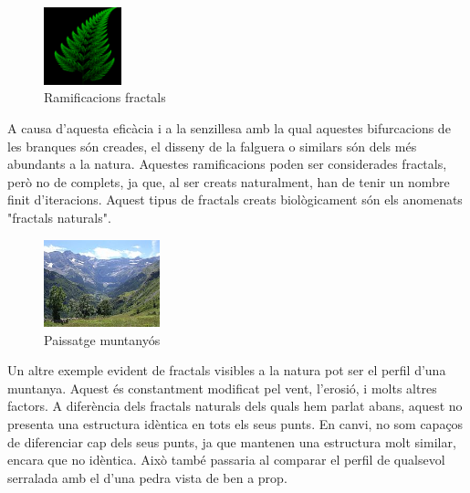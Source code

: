 \documentclass[12pt]{report}
\begin{document}
\begin{figure}
    \includegraphics [width=0.20\textwidth] {fractal.jpg}
    \caption{Ramificacions fractals}
\end{figure}

A causa d'aquesta eficàcia i a la senzillesa amb la qual aquestes bifurcacions de les branques són creades, el disseny de la falguera o similars són dels més abundants a la natura. Aquestes ramificacions poden ser considerades fractals, però no de complets, ja que, al ser creats naturalment, han de tenir un nombre finit d'iteracions. Aquest tipus de fractals creats biològicament són els anomenats "fractals naturals".
\newline


\begin{figure}
    \includegraphics[width=0.3\textwidth]{muntanya.jpg}
    \caption{Paissatge muntanyós}
    \end{figure}
Un altre exemple evident de fractals visibles a la natura pot ser el perfil d'una muntanya. Aquest és constantment modificat pel vent, l'erosió, i molts altres factors. A diferència dels fractals naturals dels quals hem parlat abans, aquest no presenta una estructura idèntica en tots els seus punts.
En canvi, no som capaços de diferenciar cap dels seus punts, ja que mantenen una estructura molt similar, encara que no idèntica. Això també passaria al comparar el perfil de qualsevol serralada amb el d'una pedra vista de ben a prop.
\newline
\end{document}
